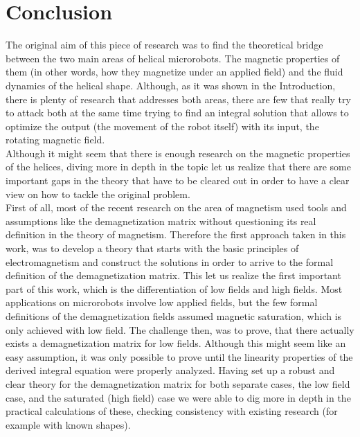 \section{Conclusion}

The original aim of this piece of research was to find the theoretical bridge between the two main areas of helical microrobots. The magnetic properties of them (in other words, how they magnetize under an applied field) and the fluid dynamics of the helical shape. Although, as it was shown in the Introduction, there is plenty of research that addresses both areas, there are few that really try to attack both at the same time trying to find an integral solution that allows to optimize the output (the movement of the robot itself) with its input, the rotating magnetic field.\\

Although it might seem that there is enough research on the magnetic properties of the helices, diving more in depth in the topic let us realize that there are some important gaps in the theory that have to be cleared out in order to have a clear view on how to tackle the original problem.\\

First of all, most of the recent research on the area of magnetism used tools and assumptions like the demagnetization matrix without questioning its real definition in the theory of magnetism. Therefore the first approach taken in this work, was to develop a theory that starts with the basic principles of electromagnetism and construct the solutions in order to arrive to the formal definition of the demagnetization matrix. This let us realize the first important part of this work, which is the differentiation of low fields and high fields. Most applications on microrobots involve low applied fields, but the few formal definitions of the demagnetization fields assumed magnetic saturation, which is only achieved with low field. The challenge then, was to prove, that there actually exists a demagnetization matrix for low fields. Although this might seem like an easy assumption, it was only possible to prove until the linearity properties of the derived integral equation were properly analyzed. Having set up a robust and clear theory for the demagnetization matrix for both separate cases, the low field case, and the saturated (high field) case we were able to dig more in depth in the practical calculations of these, checking consistency with existing research (for example with known shapes).\\

